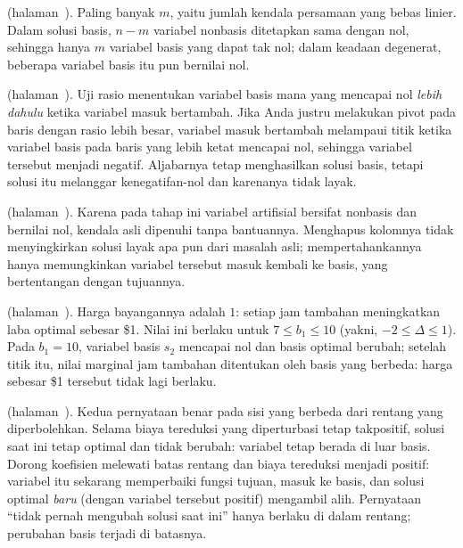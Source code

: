 \noindent\textbf{} (halaman~\pageref{lc:bfs-nonzero}).
Paling banyak $m$, yaitu jumlah kendala persamaan yang bebas linier. Dalam solusi basis, $n-m$ variabel nonbasis ditetapkan sama dengan nol, sehingga hanya $m$ variabel basis yang dapat tak nol; dalam keadaan degenerat, beberapa variabel basis itu pun bernilai nol.

\medskip

\noindent\textbf{} (halaman~\pageref{lc:ratio-test}).
Uji rasio menentukan variabel basis mana yang mencapai nol \emph{lebih dahulu} ketika variabel masuk bertambah. Jika Anda justru melakukan pivot pada baris dengan rasio lebih besar, variabel masuk bertambah melampaui titik ketika variabel basis pada baris yang lebih ketat mencapai nol, sehingga variabel tersebut menjadi negatif. Aljabarnya tetap menghasilkan solusi basis, tetapi solusi itu melanggar kenegatifan-nol dan karenanya tidak layak.

\medskip

\noindent\textbf{} (halaman~\pageref{lc:artificial-removal}).
Karena pada tahap ini variabel artifisial bersifat nonbasis dan bernilai nol, kendala asli dipenuhi tanpa bantuannya. Menghapus kolomnya tidak menyingkirkan solusi layak apa pun dari masalah asli; mempertahankannya hanya memungkinkan variabel tersebut masuk kembali ke basis, yang bertentangan dengan tujuannya.

\medskip

\noindent\textbf{} (halaman~\pageref{lc:shadow-price-b1}).
Harga bayangannya adalah $1$: setiap jam tambahan meningkatkan laba optimal sebesar \$1. Nilai ini berlaku untuk $7 \le b_1 \le 10$ (yakni, $-2 \le \Delta \le 1$). Pada $b_1 = 10$, variabel basis $s_2$ mencapai nol dan basis optimal berubah; setelah titik itu, nilai marginal jam tambahan ditentukan oleh basis yang berbeda: harga sebesar \$1 tersebut tidak lagi berlaku.

\medskip

\noindent\textbf{} (halaman~\pageref{lc:nonbasic-cost}).
Kedua pernyataan benar pada sisi yang berbeda dari rentang yang diperbolehkan. Selama biaya tereduksi yang diperturbasi tetap takpositif, solusi saat ini tetap optimal dan tidak berubah: variabel tetap berada di luar basis. Dorong koefisien melewati batas rentang dan biaya tereduksi menjadi positif: variabel itu sekarang memperbaiki fungsi tujuan, masuk ke basis, dan solusi optimal \emph{baru} (dengan variabel tersebut positif) mengambil alih. Pernyataan ``tidak pernah mengubah solusi saat ini'' hanya berlaku di dalam rentang; perubahan basis terjadi di batasnya.

